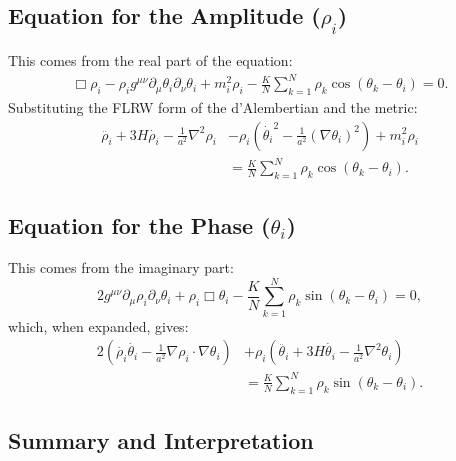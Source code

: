 \subsection*{Equation for the Amplitude ($\rho_i$)}
This comes from the real part of the equation:
\begin{equation}
    \begin{aligned}
        \Box \rho_i - \rho_i g^{\mu\nu}\partial_\mu\theta_i \partial_\nu\theta_i + m_i^2\rho_i
        - \frac{K}{N} \sum_{k=1}^N \rho_k \cos(\theta_k - \theta_i) = 0 .
    \end{aligned}
\end{equation}
Substituting the FLRW form of the d'Alembertian and the metric:
\begin{equation}
    {
    \begin{aligned}
        \ddot{\rho_i} + 3H\dot{\rho_i} - \frac{1}{a^2}\nabla^2\rho_i
        &- \rho_i \left( \dot{\theta_i}^2 - \frac{1}{a^2}(\nabla\theta_i)^2 \right) + m_i^2\rho_i \\
        &= \frac{K}{N} \sum_{k=1}^N \rho_k \cos(\theta_k - \theta_i) .
    \end{aligned}
    } \tag{14} \label{eq:14}
\end{equation}

\subsection*{Equation for the Phase ($\theta_i$)}
This comes from the imaginary part:
\begin{equation}
    2g^{\mu\nu}\partial_\mu\rho_i \partial_\nu\theta_i + \rho_i \Box \theta_i
    - \frac{K}{N} \sum_{k=1}^N \rho_k \sin(\theta_k - \theta_i) = 0 ,
\end{equation}
which, when expanded, gives:
\begin{equation}
    {
    \begin{aligned}
        2\left(\dot{\rho_i}\dot{\theta_i} - \frac{1}{a^2}\nabla\rho_i\cdot\nabla\theta_i\right)
        &+ \rho_i\left(\ddot{\theta_i} + 3H\dot{\theta_i} - \frac{1}{a^2}\nabla^2\theta_i\right) \\
        &= \frac{K}{N} \sum_{k=1}^N \rho_k \sin(\theta_k - \theta_i) .
    \end{aligned}
    } \tag{16} \label{eq:16}
\end{equation}

\subsection{Summary and Interpretation}
\label{subsec:summary}


